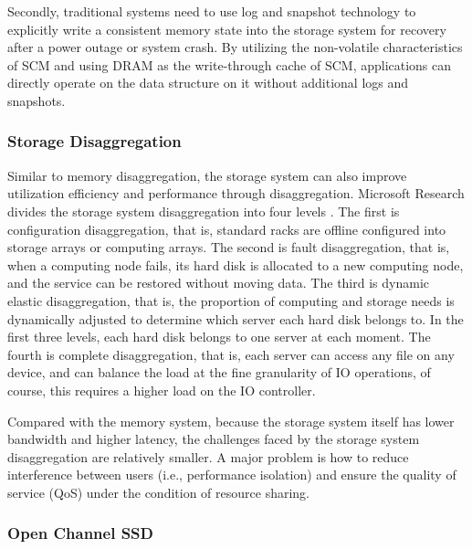 Secondly, traditional systems need to use log and snapshot technology to explicitly write a consistent memory state into the storage system for recovery after a power outage or system crash. By utilizing the non-volatile characteristics of SCM and using DRAM as the write-through cache of SCM, applications can directly operate on the data structure on it without additional logs and snapshots.

\subsubsection{Storage Disaggregation}

Similar to memory disaggregation, the storage system can also improve utilization efficiency and performance through disaggregation. Microsoft Research divides the storage system disaggregation into four levels \cite{legtchenko2017understanding}. The first is configuration disaggregation, that is, standard racks are offline configured into storage arrays or computing arrays. The second is fault disaggregation, that is, when a computing node fails, its hard disk is allocated to a new computing node, and the service can be restored without moving data. The third is dynamic elastic disaggregation, that is, the proportion of computing and storage needs is dynamically adjusted to determine which server each hard disk belongs to. In the first three levels, each hard disk belongs to one server at each moment. The fourth is complete disaggregation, that is, each server can access any file on any device, and can balance the load at the fine granularity of IO operations, of course, this requires a higher load on the IO controller.

Compared with the memory system, because the storage system itself has lower bandwidth and higher latency, the challenges faced by the storage system disaggregation are relatively smaller. A major problem is how to reduce interference between users (i.e., performance isolation) and ensure the quality of service (QoS) under the condition of resource sharing.

\subsubsection{Open Channel SSD}

